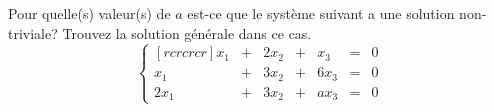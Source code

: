 \begin{TwoCol}
\begin{exercice}
	Pour quelle(s) valeur(s) de $a$ est-ce que le système suivant a une solution non-triviale?
	Trouvez la solution générale dans ce cas.
	\[
	\left\{
	\begin{matrix}[rcrcrcr]
	x_1 &+& 2x_2 &+& x_3 &=& 0 \\
	x_1 &+& 3x_2 &+& 6x_3 &=& 0 \\
	2x_1 &+& 3x_2 &+& ax_3 &=& 0
	\end{matrix}
	\right.
	\]
\end{exercice}
\end{TwoCol}

